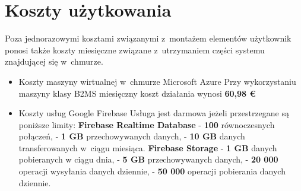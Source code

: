 \section{Koszty użytkowania}
Poza jednorazowymi kosztami związanymi z~montażem elementów użytkownik ponosi także koszty miesięczne związane z~utrzymaniem części systemu znajdującej się w~chmurze.
\begin{itemize}
    \item Koszty maszyny wirtualnej w~chmurze Microsoft Azure \newline
    Przy wykorzystaniu maszyny klasy B2MS miesięczny koszt działania wynosi \textbf{60,98 €}
    \item Koszty usług Google Firebase\newline
    Usługa jest darmowa jeżeli przestrzegane są poniższe limity:
    \subitem \textbf{Firebase Realtime Database}
    \subsubitem - \textbf{100} równoczesnych połączeń,
    \subsubitem - \textbf{1 GB} przechowywanych danych,
    \subsubitem - \textbf{10 GB} danych transferowanych w~ciągu miesiąca.
    \subitem \textbf{Firebase Storage}
    \subsubitem - \textbf{1 GB} danych pobieranych w ciągu dnia,
    \subsubitem - \textbf{5 GB} przechowywanych danych,
    \subsubitem - \textbf{20 000} operacji wysyłania danych dziennie,
    \subsubitem - \textbf{50 000} operacji pobierania danych dziennie.
\end{itemize}
